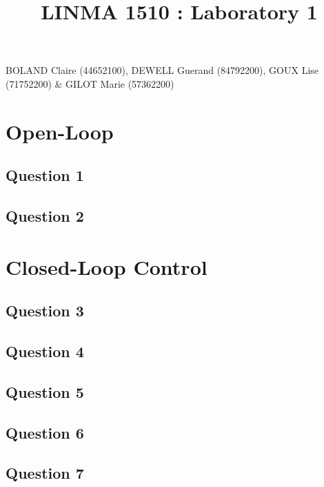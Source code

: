 \documentclass{article}
\title{\huge \bfseries LINMA 1510 : Laboratory 1}
\date{}
\begin{document}
\maketitle

\vspace*{-7em}
\begin{center}
    \Large BOLAND Claire (44652100), DEWELL Guerand (84792200), GOUX Lise (71752200) \& GILOT Marie (57362200)
    
\end{center}



\section{Open-Loop}
\subsection{Question 1}



\subsection{Question 2}



\section{Closed-Loop Control}

\subsection{Question 3}



\subsection{Question 4}



\subsection{Question 5}



\subsection{Question 6}



\subsection{Question 7}
\end{document}
